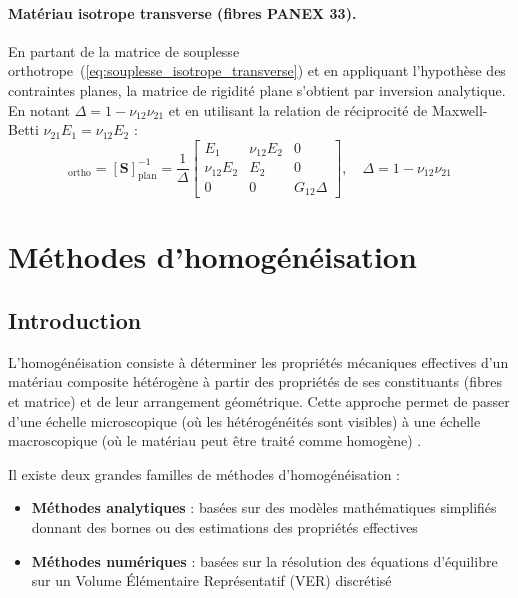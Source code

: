 \documentclass[a4paper,11pt]{article}
\begin{document}
\paragraph{Matériau isotrope transverse (fibres PANEX 33).} En partant de la matrice de souplesse orthotrope~(\ref{eq:souplesse_isotrope_transverse}) et en appliquant l'hypothèse des contraintes planes, la matrice de rigidité plane s'obtient par inversion analytique. En notant $\Delta = 1 - \nu_{12}\nu_{21}$ et en utilisant la relation de réciprocité de Maxwell-Betti $\nu_{21}E_1 = \nu_{12}E_2$ :
\begin{equation}
    [\mathbf{C}]_{\mathrm{ortho}} = [\mathbf{S}]_{\mathrm{plan}}^{-1} =
    \frac{1}{\Delta}
    \begin{bmatrix}
        E_1 & \nu_{12} E_2 & 0 \\
        \nu_{12} E_2 & E_2 & 0 \\
        0 & 0 & G_{12}\Delta
    \end{bmatrix},
    \quad \Delta = 1 - \nu_{12}\nu_{21}
    \label{eq:rigidite_ortho_plane}
\end{equation}

\section{Méthodes d'homogénéisation}

\subsection{Introduction}
L'homogénéisation consiste à déterminer les propriétés mécaniques effectives d'un matériau composite hétérogène à partir des propriétés de ses constituants (fibres et matrice) et de leur arrangement géométrique. Cette approche permet de passer d'une échelle microscopique (où les hétérogénéités sont visibles) à une échelle macroscopique (où le matériau peut être traité comme homogène) \cite{CharronCC} \cite{WallHomog}.

Il existe deux grandes familles de méthodes d'homogénéisation :
\begin{itemize}
    \item \textbf{Méthodes analytiques} : basées sur des modèles mathématiques simplifiés donnant des bornes ou des estimations des propriétés effectives
    \item \textbf{Méthodes numériques} : basées sur la résolution des équations d'équilibre sur un Volume Élémentaire Représentatif (VER) discrétisé
\end{itemize}
\end{document}
